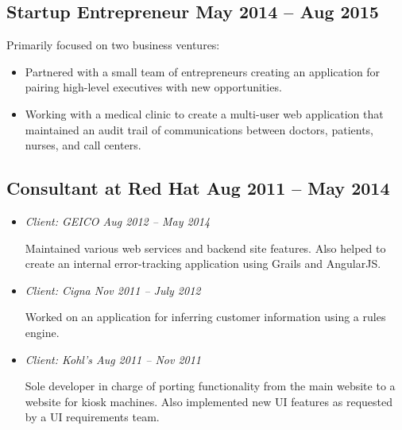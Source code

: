 \documentclass[12pt]{article}
\begin{document}
    

\subsection*{Startup Entrepreneur \hfill May 2014 -- Aug 2015}

Primarily focused on two business ventures:

\begin{itemize}
\item Partnered with a small team of entrepreneurs creating an application for
  pairing high-level executives with new opportunities.

\item Working with a medical clinic to create a multi-user web application that
  maintained an audit trail of communications between doctors, patients, nurses,
  and call centers.
\end{itemize}

     
\tag{\LaTeX}

\subsection*{Consultant at Red Hat \hfill Aug 2011 -- May 2014}

\begin{itemize}
\item \textit{Client: GEICO \hfill Aug 2012 -- May 2014}

  Maintained various web services and backend site features. Also helped to
  create an internal error-tracking application using Grails and AngularJS.

       

\item \textit{Client: Cigna \hfill Nov 2011 -- July 2012}

  Worked on an application for inferring customer information using a rules
  engine.

   

\item \textit{Client: Kohl's \hfill Aug 2011 -- Nov 2011}

  Sole developer in charge of porting functionality from the main website to a
  website for kiosk machines. Also implemented new UI features as requested by a
  UI requirements team.

   
\end{itemize}
\end{document}
